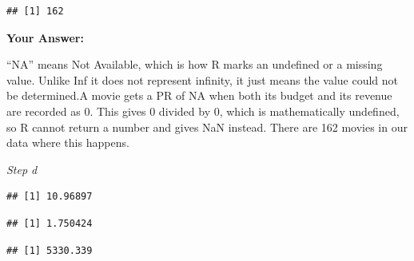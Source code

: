 \documentclass[
]{article}
\newenvironment{Shaded}{\begin{snugshade}}{\end{snugshade}}
\newcommand{\AttributeTok}[1]{\textcolor[rgb]{0.13,0.29,0.53}{#1}}
\newcommand{\CommentTok}[1]{\textcolor[rgb]{0.56,0.35,0.01}{\textit{#1}}}
\newcommand{\ConstantTok}[1]{\textcolor[rgb]{0.56,0.35,0.01}{#1}}
\newcommand{\FunctionTok}[1]{\textcolor[rgb]{0.13,0.29,0.53}{\textbf{#1}}}
\newcommand{\NormalTok}[1]{#1}
\newcommand{\OtherTok}[1]{\textcolor[rgb]{0.56,0.35,0.01}{#1}}
\newcommand{\SpecialCharTok}[1]{\textcolor[rgb]{0.81,0.36,0.00}{\textbf{#1}}}
\begin{document}
\begin{verbatim}
## [1] 162
\end{verbatim}

\textbf{Your Answer:}

``NA'' means Not Available, which is how R marks an undefined or a
missing value. Unlike Inf it does not represent infinity, it just means
the value could not be determined.A movie gets a PR of NA when both its
budget and its revenue are recorded as 0. This gives 0 divided by 0,
which is mathematically undefined, so R cannot return a number and gives
NaN instead. There are 162 movies in our data where this happens.

\emph{Step d}

\begin{Shaded}
\end{Shaded}

\begin{verbatim}
## [1] 10.96897
\end{verbatim}

\begin{Shaded}
\end{Shaded}

\begin{verbatim}
## [1] 1.750424
\end{verbatim}

\begin{Shaded}
\end{Shaded}

\begin{verbatim}
## [1] 5330.339
\end{verbatim}
\end{document}
